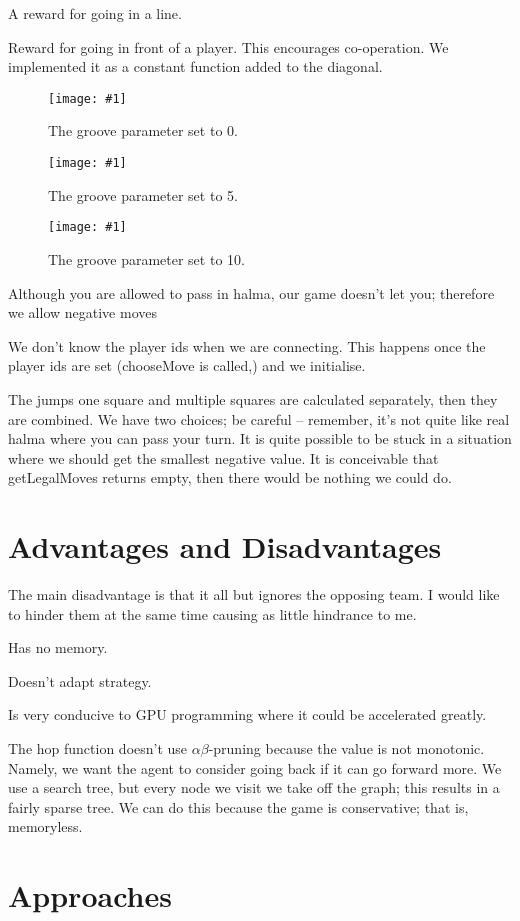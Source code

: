 \documentclass[twocolumn]{article}
\def\fig#1#2{\begin{figure}[!ht]\begin{center}
\texttt{[image: \#1]}
\end{center}\caption{#2}\label{#1}\end{figure}}
\begin{document}
A reward for going in a line.

Reward for going in front of a player. This encourages co-operation. We implemented it as a constant function added to the diagonal.

\fig{param0.jpg}{The groove parameter set to 0.}

\fig{param5.jpg}{The groove parameter set to 5.}

\fig{param10.jpg}{The groove parameter set to 10.}

Although you are allowed to pass in halma, our game doesn't let
you; therefore we allow negative moves

We don't know the player ids when we are connecting. This happens once the player ids are set (chooseMove is called,) and we initialise.

The jumps one square and multiple squares are calculated separately, then they are combined.
We have two choices; be careful -- remember, it's not quite like real
halma where you can pass your turn. It is quite possible to be stuck
in a situation where we should get the smallest negative value.
It is conceivable that getLegalMoves returns empty, then there would be nothing we could do.

\section{Advantages and Disadvantages}


The main disadvantage is that it all but ignores the opposing team. I would like to hinder them at the same time causing as little hindrance to me.

Has no memory.

Doesn't adapt strategy.

Is very conducive to GPU programming where it could be accelerated greatly.

The hop function doesn't use $\alpha\beta$-pruning because the value is not monotonic. Namely, we want the agent to consider going back if it can go forward more. We use a search tree, but every node we visit we take off the graph; this results in a fairly sparse tree. We can do this because the game is conservative; that is, memoryless.

\section{Approaches}
\end{document}
